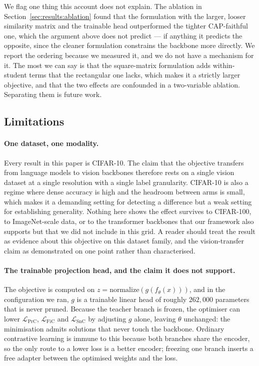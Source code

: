 We flag one thing this account does not explain. The ablation in
Section~\ref{sec:results:ablation} found that the formulation with the larger,
looser similarity matrix and the trainable head outperformed the tighter
CAP-faithful one, which the argument above does not predict --- if anything it
predicts the opposite, since the cleaner formulation constrains the backbone more
directly. We report the ordering because we measured it, and we do not have a
mechanism for it. The most we can say is that the square-matrix formulation adds
within-student terms that the rectangular one lacks, which makes it a strictly
larger objective, and that the two effects are confounded in a two-variable
ablation. Separating them is future work.

\subsection{Limitations}
\label{sec:discussion:limitations}

\paragraph{One dataset, one modality.}
Every result in this paper is CIFAR-10. The claim that the objective transfers
from language models to vision backbones therefore rests on a single vision
dataset at a single resolution with a single label granularity. CIFAR-10 is also
a regime where dense accuracy is high and the headroom between arms is small,
which makes it a demanding setting for detecting a difference but a weak setting
for establishing generality. Nothing here shows the effect survives to CIFAR-100,
to ImageNet-scale data, or to the transformer backbones that our framework also
supports but that we did not include in this grid. A reader should treat the
result as evidence about this objective on this dataset family, and the
vision-transfer claim as demonstrated on one point rather than characterised.

\paragraph{The trainable projection head, and the claim it does not support.}
The objective is computed on $z = \mathrm{normalize}(g(f_\theta(x)))$, and in the
configuration we ran, $g$ is a trainable linear head of roughly $262{,}000$
parameters that is never pruned. Because the teacher branch is frozen, the
optimiser can lower $\mathcal{L}_{\mathrm{PrC}}$, $\mathcal{L}_{\mathrm{FiC}}$ and
$\mathcal{L}_{\mathrm{SnC}}$ by adjusting $g$ alone, leaving $\theta$ unchanged:
the minimisation admits solutions that never touch the backbone. Ordinary
contrastive learning is immune to this because both branches share the encoder, so
the only route to a lower loss is a better encoder; freezing one branch inserts a
free adapter between the optimised weights and the loss.

